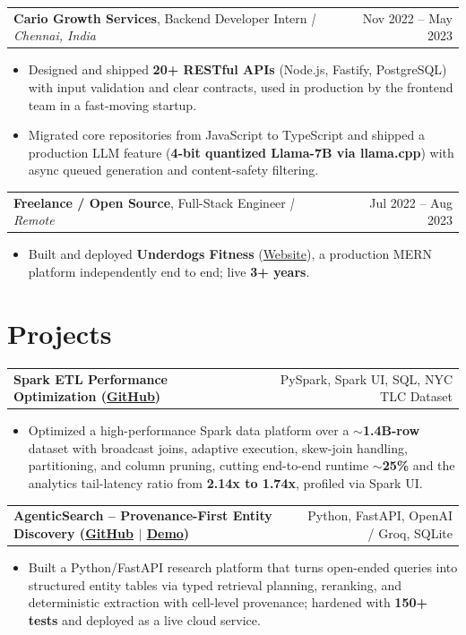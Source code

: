 \documentclass[letterpaper,11pt]{article}
\makeatletter
\newcommand{\expItem}[4]{%
  \vspace{3pt}
  \begin{tabular*}{\textwidth}{@{}l@{\extracolsep{\fill}}r@{}}
    \textbf{#1}, #2 \textit{| #3} & #4 \\
  \end{tabular*}\par\vspace{-2pt}
}
\newcommand{\projItem}[2]{%
  \vspace{6pt}
  \begin{tabular*}{\textwidth}{@{}l@{\extracolsep{\fill}}r@{}}
    \textbf{#1} & #2 \\
  \end{tabular*}\par\vspace{-2pt}
}
\makeatother
\begin{document}
\expItem{Cario Growth Services}{Backend Developer Intern}{Chennai, India}{Nov 2022 -- May 2023}
\begin{itemize}
  \item Designed and shipped \textbf{20+ RESTful APIs} (Node.js, Fastify, PostgreSQL) with input validation and clear contracts, used in production by the frontend team in a fast-moving startup.
  \item Migrated core repositories from JavaScript to TypeScript and shipped a production LLM feature (\textbf{4-bit quantized Llama-7B via llama.cpp}) with async queued generation and content-safety filtering.
\end{itemize}

\expItem{Freelance / Open Source}{Full-Stack Engineer}{Remote}{Jul 2022 -- Aug 2023}
\begin{itemize}
  \item Built and deployed \textbf{Underdogs Fitness} (\href{https://www.underdogsfitness.in/}{Website}), a production MERN platform independently end to end; live \textbf{3+ years}.
\end{itemize}

\section{Projects}

\projItem{Spark ETL Performance Optimization {\normalfont\small(\href{https://github.com/Deva-1903/Spark-ETL-Optimization}{GitHub})}}{PySpark, Spark UI, SQL, NYC TLC Dataset}
\begin{itemize}
  \item Optimized a high-performance Spark data platform over a \textbf{$\sim$1.4B-row} dataset with broadcast joins, adaptive execution, skew-join handling, partitioning, and column pruning, cutting end-to-end runtime \textbf{$\sim$25\%} and the analytics tail-latency ratio from \textbf{2.14x to 1.74x}, profiled via Spark UI.
\end{itemize}

\projItem{AgenticSearch -- Provenance-First Entity Discovery {\normalfont\small(\href{https://github.com/Deva-1903/ciir_agentic_search}{GitHub} $\vert$ \href{https://agentic-search-negglszkwa-uc.a.run.app}{Demo})}}{Python, FastAPI, OpenAI / Groq, SQLite}
\begin{itemize}
  \item Built a Python/FastAPI research platform that turns open-ended queries into structured entity tables via typed retrieval planning, reranking, and deterministic extraction with cell-level provenance; hardened with \textbf{150+ tests} and deployed as a live cloud service.
\end{itemize}
\end{document}
